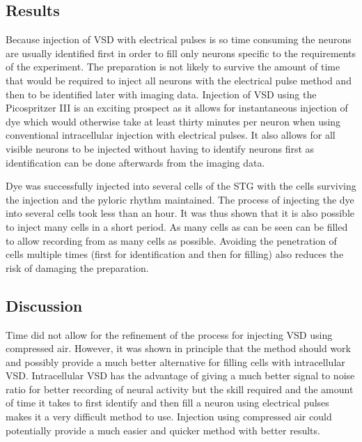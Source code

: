 \subsection{Results}
Because injection of \ac{VSD} with electrical pulses is so time consuming the neurons are usually identified first in order to fill only neurons specific to the requirements of the experiment. The preparation is not likely to survive the amount of time that would be required to inject all neurons with the electrical pulse method and then to be identified later with imaging data. Injection of \ac{VSD} using the Picospritzer III is an exciting prospect as it allows for instantaneous injection of dye which would otherwise take at least thirty minutes per neuron when using conventional intracellular injection with electrical pulses. It also allows for all visible neurons to be injected without having to identify neurons first as identification can be done afterwards from the imaging data.

Dye was successfully injected into several cells of the \ac{STG} with the cells surviving the injection and the pyloric rhythm maintained. The process of injecting the dye into several cells took less than an hour. It was thus shown that it is also possible to inject many cells in a short period. As many cells as can be seen can be filled to allow recording from as many cells as possible. Avoiding the penetration of cells multiple times (first for identification and then for filling) also reduces the risk of damaging the preparation. 

\subsection{Discussion}
Time did not allow for the refinement of the process for injecting \ac{VSD} using compressed air. However, it was shown in principle that the method should work and possibly provide a much better alternative for filling cells with intracellular \ac{VSD}. Intracellular \ac{VSD} has the advantage of giving a much better signal to noise ratio for better recording of neural activity but the skill required and the amount of time it takes to first identify and then fill a neuron using electrical pulses makes it a very difficult method to use. Injection using compressed air could potentially provide a much easier and quicker method with better results.

